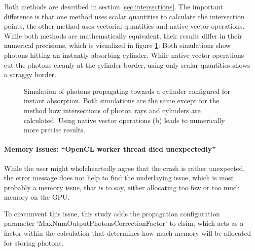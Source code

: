 Both methods are described in section \ref{sec:intersections}. The important difference is that one method uses scalar quantities to calculate the intersection points, the other method uses vectorial quantities and native vector operations. While both methods are mathematically equivalent, their results differ in their numerical precisions, which is visualized in figure \ref{fig:usie5Ohj}: Both simulations show photons hitting an instantly absorbing cylinder. While native vector operations cut the photons cleanly at the cylinder border, using only scalar quantities shows a scraggy border.

\begin{figure}[htbp]
  \hfill
  \hfill
  \caption{Simulation of photons propagating towards a cylinder configured for instant absorption. Both simulations are the same except for the method how intersections of photon rays and cylinders are calculated. Using native vector operations (b) leads to numerically more precise results.}
  \label{fig:usie5Ohj}
\end{figure}



\paragraph{Memory Issues: ``OpenCL worker thread died unexpectedly''}
While the user might wholeheartedly agree that the crash is rather unexpected, the error message does not help to find the underlaying issue, which is most probably a memory issue, that is to say, either allocating too few or too much memory on the GPU.

To circumvent this issue, this study adds the propagation configuration parameter `MaxNumOutputPhotonsCorrectionFactor` to clsim, which acts as a factor within the calculation that determines how much memory will be allocated for storing photons.

